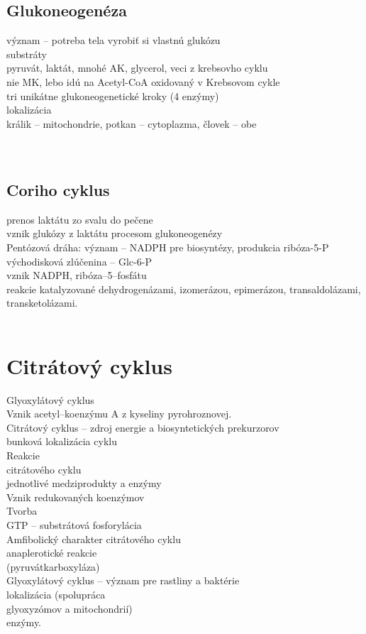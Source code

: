 \subsection*{Glukoneogenéza}
význam -- potreba tela vyrobiť si vlastnú glukózu\\
substráty\\
\tab pyruvát, laktát, mnohé AK, glycerol, veci z krebsovho cyklu\\
\tab nie MK, lebo idú na Acetyl-CoA oxidovaný v Krebsovom cykle\\
tri unikátne glukoneogenetické kroky (4 enzýmy)\\
lokalizácia\\
\tab králik -- mitochondrie, potkan -- cytoplazma, človek -- obe\\
\\
\\
\subsection*{Coriho cyklus}
prenos laktátu zo svalu do pečene\\
vznik glukózy z laktátu procesom glukoneogenézy\\
Pentózová dráha: 
\tab význam -- NADPH pre biosyntézy, produkcia ribóza-5-P\\
\tab východisková zlúčenina -- Glc-6-P\\
\tab vznik NADPH, ribóza--5--fosfátu\\
\tab reakcie katalyzované dehydrogenázami, izomerázou, epimerázou, transaldolázami, transketolázami.\\
\\
\section{Citrátový cyklus}
Glyoxylátový cyklus\\
Vznik acetyl--koenzýmu A z kyseliny pyrohroznovej.\\
Citrátový cyklus -- zdroj energie a biosyntetických prekurzorov\\
\tab bunková lokalizácia cyklu\\
Reakcie\\
citrátového cyklu\\
\tab jednotlivé medziprodukty a enzýmy\\
Vznik redukovaných koenzýmov\\
Tvorba\\
GTP -- substrátová fosforylácia\\
Amfibolický charakter citrátového cyklu\\
\tab anaplerotické reakcie\\
(pyruvátkarboxyláza)\\
Glyoxylátový cyklus -- význam pre rastliny a baktérie\\
\tab lokalizácia (spolupráca\\
glyoxyzómov a mitochondrií)\\
\tab enzýmy.\\
\\
